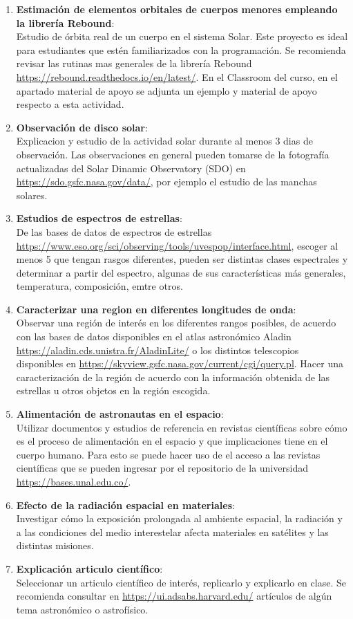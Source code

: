 \documentclass[12pt]{article}
\begin{document}
\begin{enumerate}
    \item \textbf{Estimación de elementos orbitales de cuerpos menores empleando la librería Rebound}:\\Estudio de órbita real de un cuerpo en el sistema Solar. Este proyecto es ideal para estudiantes que estén familiarizados con la programación. Se recomienda revisar las rutinas mas generales de la librería Rebound \url{https://rebound.readthedocs.io/en/latest/}. En el Classroom del curso, en el apartado material de apoyo se adjunta un ejemplo y material de apoyo respecto a esta actividad.
    \item \textbf{Observación de disco solar}:\\ Explicacion y estudio de la actividad solar durante al menos 3 dias de observación. Las observaciones en general pueden tomarse de la fotografía actualizadas del Solar Dinamic Observatory (SDO) en \url{https://sdo.gsfc.nasa.gov/data/}, por ejemplo el estudio de las manchas solares.
    \item \textbf{Estudios de espectros de estrellas}:\\De las bases de datos de espectros de estrellas \url{https://www.eso.org/sci/observing/tools/uvespop/interface.html}, escoger al menos 5 que tengan rasgos diferentes, pueden ser distintas clases espectrales y determinar a partir del espectro, algunas de sus características más generales, temperatura, composición, emtre otros.
    \item \textbf{Caracterizar una region  en diferentes longitudes de onda}:\\Observar una región de interés en los diferentes rangos posibles, de acuerdo con las bases de datos disponibles en el atlas astronómico Aladin \url{https://aladin.cds.unistra.fr/AladinLite/} o los distintos telescopios  disponibles en \url{https://skyview.gsfc.nasa.gov/current/cgi/query.pl}. Hacer una caracterización de la región de acuerdo con la información obtenida de las estrellas u otros objetos en la región escogida.
    \item \textbf{Alimentación de astronautas en el espacio}:\\Utilizar documentos y estudios de referencia en revistas científicas sobre cómo es el proceso de alimentación en el espacio y que implicaciones tiene en el cuerpo humano. Para esto se puede hacer uso de el acceso a las revistas científicas que se pueden ingresar por el repositorio de la universidad \url{https://bases.unal.edu.co/}.
    \item \textbf{Efecto de la radiación espacial en materiales}:\\Investigar cómo la exposición prolongada al ambiente espacial, la radiación y a las condiciones del medio interestelar afecta materiales en satélites y las distintas misiones.
    \item \textbf{Explicación articulo científico}:\\Seleccionar un articulo científico de interés, replicarlo y explicarlo en clase. Se recomienda consultar en \url{https://ui.adsabs.harvard.edu/} artículos de algún tema astronómico o astrofísico.
\end{enumerate}
\end{document}

